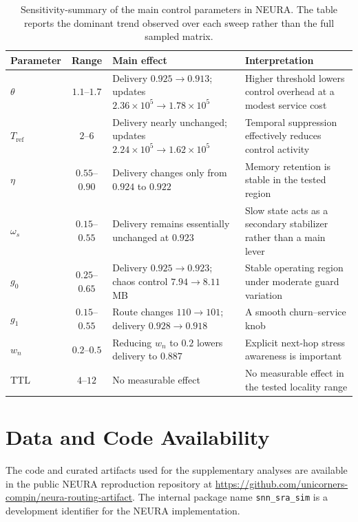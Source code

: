 \documentclass[5p,times]{elsarticle}
\begin{document}
\begin{table}[t]
\centering
\scriptsize
\caption{Sensitivity-summary of the main control parameters in NEURA. The table reports the dominant trend observed over each sweep rather than the full sampled matrix.}
\label{tab:sensitivity-summary}
\renewcommand{\arraystretch}{1.05}
\begin{tabularx}{\columnwidth}{@{}l c >{\raggedright\arraybackslash}X >{\raggedright\arraybackslash}X@{}}
\toprule
Parameter & Range & Main effect & Interpretation \\
\midrule
$\theta$ & $1.1$--$1.7$ &
Delivery $0.925\!\rightarrow\!0.913$; updates $2.36\times10^5\!\rightarrow\!1.78\times10^5$ &
Higher threshold lowers control overhead at a modest service cost \\

$T_{\mathrm{ref}}$ & $2$--$6$ &
Delivery nearly unchanged; updates $2.24\times10^5\!\rightarrow\!1.62\times10^5$ &
Temporal suppression effectively reduces control activity \\

$\eta$ & $0.55$--$0.90$ &
Delivery changes only from $0.924$ to $0.922$ &
Memory retention is stable in the tested region \\

$\omega_s$ & $0.15$--$0.55$ &
Delivery remains essentially unchanged at $0.923$ &
Slow state acts as a secondary stabilizer rather than a main lever \\

$g_0$ & $0.25$--$0.65$ &
Delivery $0.925\!\rightarrow\!0.923$; chaos control $7.94\!\rightarrow\!8.11$ MB &
Stable operating region under moderate guard variation \\

$g_1$ & $0.15$--$0.55$ &
Route changes $110\!\rightarrow\!101$; delivery $0.928\!\rightarrow\!0.918$ &
A smooth churn--service knob \\

$w_n$ & $0.2$--$0.5$ &
Reducing $w_n$ to $0.2$ lowers delivery to $0.887$ &
Explicit next-hop stress awareness is important \\

TTL & $4$--$12$ &
No measurable effect &
No measurable effect in the tested locality range \\
\bottomrule
\end{tabularx}
\end{table}

\section*{Data and Code Availability}
The code and curated artifacts used for the supplementary analyses are available in the public NEURA reproduction repository at \url{https://github.com/unicorners-compin/neura-routing-artifact}. The internal package name \texttt{snn\_sra\_sim} is a development identifier for the NEURA implementation.
\end{document}
